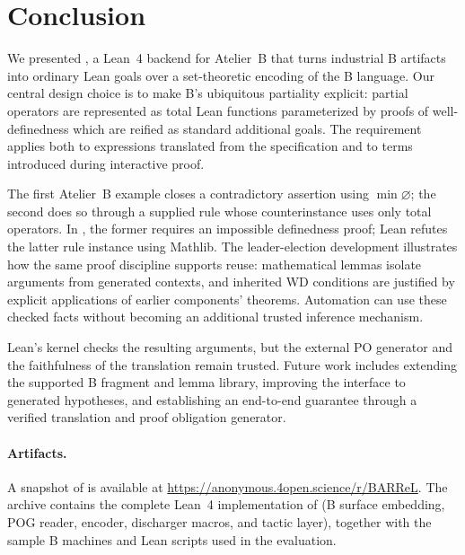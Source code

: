 \section{Conclusion}
We presented \barrel, a Lean~4 backend for Atelier~B that turns industrial B artifacts into ordinary Lean goals over a set-theoretic encoding of the B language.
Our central design choice is to make B's ubiquitous partiality explicit: partial operators are represented as total Lean functions parameterized by proofs of well-definedness which are reified as standard additional goals.
The requirement applies both to expressions translated from the specification and to terms introduced during interactive proof.

The first Atelier~B example closes a contradictory assertion using \(\min\varnothing\); the second does so through a supplied rule whose counterinstance uses only total operators.
In \barrel, the former requires an impossible definedness proof; Lean refutes the latter rule instance using Mathlib.
The leader-election development illustrates how the same proof discipline supports reuse: mathematical lemmas isolate arguments from generated contexts, and inherited WD conditions are justified by explicit applications of earlier components' theorems.
Automation can use these checked facts without becoming an additional trusted inference mechanism.

Lean's kernel checks the resulting arguments, but the external PO generator and the faithfulness of the translation remain trusted.
Future work includes extending the supported B fragment and lemma library, improving the interface to generated hypotheses, and establishing an end-to-end guarantee through a verified translation and proof obligation generator.

\paragraph*{Artifacts.}
A snapshot of \barrel is available at \url{https://anonymous.4open.science/r/BARReL}.
The archive contains the complete Lean~4 implementation of \barrel (B surface embedding, POG reader, encoder, discharger macros, and tactic layer), together with the sample B machines and Lean scripts used in the evaluation.
